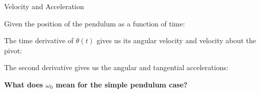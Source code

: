 \documentclass[12pt,compress,aspectratio=169]{beamer}
\begin{document}
\begin{frame}{Velocity and Acceleration}

  Given the position of the pendulum as a function of time:
  

  The time derivative of $\theta(t)$ gives us its angular
  velocity and velocity about the pivot:


  The second derivative gives us the angular and tangential accelerations:


  \textbf{What does $\omega_0$ mean for the simple pendulum case?}
\end{frame}
\end{document}
